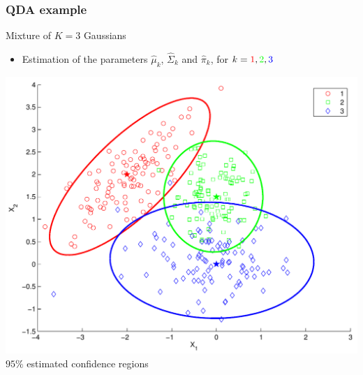 \documentclass[compress, smaller, serif, 9pt]{beamer}
\begin{document}
\begin{frame}
  \frametitle{QDA example}
\begin{block}{Mixture of $K=3$ Gaussians}
\begin{itemize}
   \item Estimation of the parameters $\hat{\mu}_k$, $\hat{\Sigma}_k$ and $\hat{\pi}_k$, for
   $k= \textcolor{red}{1},\textcolor{green}{2},\textcolor{blue}{3}$
\end{itemize}
\end{block}
\vspace*{-5mm}

\begin{center}
  \includegraphics[width=.65\textwidth]{quad_analysis_CI.pdf} \\
  $95\%$ estimated confidence regions
\end{center}

\end{frame}
\end{document}
